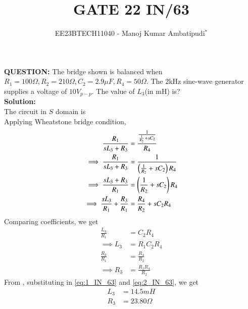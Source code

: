 \documentclass[journal,12pt,twocolumn]{IEEEtran}
\theoremstyle{remark}
\begin{document}

\vspace{3cm}
\title{GATE 22 IN/63}
\author{EE23BTECH11040 - Manoj Kumar Ambatipudi$^{*}$%
}
\maketitle
\newpage
\bigskip
\renewcommand{\thefigure}{\theenumi}
\renewcommand{\thetable}{\theenumi}
\textbf{QUESTION:}
The bridge shown is balanced when $R_1 = 100\Omega, R_2 = 210\Omega, C_2 = 2.9\mu F, R_4 = 50\Omega$. The 2kHz sine-wave generator supplies a voltage of $10 V_{p-p}$. The value of $L_3$(in mH) is?
\\
\textbf{Solution:}
\\
The circuit in $S$ domain is 
\\
Applying Wheatstone bridge condition, 
\begin{align}
    \frac{R_1}{sL_3 + R_3} &= \frac{\frac{1}{\frac{1}{R_2} + sC_2}}{R_4}\\
\implies \frac{R_1}{sL_3 + R_3} &= \frac{1}{\left(\frac{1}{R_2} + sC_2\right)R_4}\\
\implies \frac{sL_3 + R_3}{R_1} &= \left(\frac{1}{R_2} + sC_2\right)R_4\\
\implies \frac{sL_3}{R_1} + \frac{R_3}{R_1} &= \frac{R_4}{R_2} + sC_2R_4
\end{align}
Comparing coefficients, we get
\begin{align}
    \frac{L_3}{R_1} &= C_2R_4\\
\implies L_3 &= R_1C_2R_4\label{eq:1_IN_63}\\
    \frac{R_3}{R_1} &= \frac{R_4}{R_2}\\
\implies R_3 &= \frac{R_1R_4}{R_2}   \label{eq:2_IN_63} 
\end{align}
From , substituting in \eqref{eq:1_IN_63} and \eqref{eq:2_IN_63}, we get
\begin{align}
    L_3 &= 14.5 mH\\
    R_3 &= 23.80\Omega
\end{align}
\end{document}
